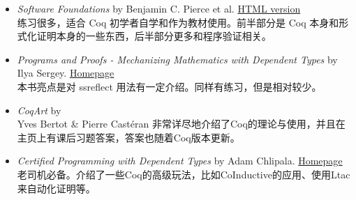 \begin{itemize}
    \item \emph{Software Foundations} by Benjamin C. Pierce et al.
          \href{https://www.cis.upenn.edu/~bcpierce/sf/current/index.html}{HTML version}\\
          练习很多，适合 Coq 初学者自学和作为教材使用。前半部分是 Coq 本身和形式化证明本身的一些东西，后半部分更多和程序验证相关。
    \item \emph{Programs and Proofs - Mechanizing Mathematics with Dependent Types} by Ilya Sergey.
          \href{http://ilyasergey.net/pnp}{Homepage}\\
          本书亮点是对 ssreflect 用法有一定介绍。同样有练习，但是相对较少。
    \item \emph{CoqArt} by
          \href{https://www.labri.fr/perso/casteran/CoqArt/}\\ Yves Bertot \& Pierre Castéran
          非常详尽地介绍了Coq的理论与使用，并且在主页上有课后习题答案，答案也随着Coq版本更新。
    \item \emph{Certified Programming with Dependent Types} by Adam Chlipala.
          \href{http://adam.chlipala.net/cpdt/}{Homepage}\\
          老司机必备。介绍了一些Coq的高级玩法，比如CoInductive的应用、使用Ltac来自动化证明等。
\end{itemize}
